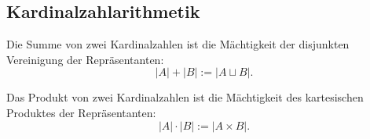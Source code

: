 \subsection{Kardinalzahlarithmetik}
\begin{definition}\mbox{}\newline
Die Summe von zwei Kardinalzahlen ist die Mächtigkeit
der disjunkten Vereinigung der Repräsentanten:%
\begin{equation}
|A|+|B| := |A\sqcup B|.
\end{equation}
\end{definition}

\begin{definition}\mbox{}\newline
Das Produkt von zwei Kardinalzahlen ist die Mächtigkeit
des kartesischen Produktes der Repräsentanten:%
\begin{equation}
|A|\cdot |B| := |A\times B|.
\end{equation}
\end{definition}

